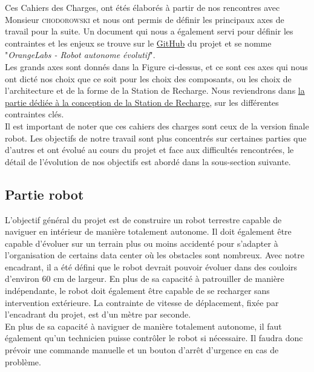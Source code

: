\documentclass[french]{rapportENSTAB}
\begin{document}
Ces Cahiers des Charges, ont étés élaborés à partir de nos rencontres avec Monsieur \textsc{chodorowski} et nous ont permis de définir les principaux axes de travail pour la suite. Un document qui nous a également servi pour définir les contraintes et les enjeux se trouve sur le  \href{https://github.com/AntoninLize/Projet_OrangeLabs}{GitHub} du projet et se nomme "\textit{OrangeLabs - Robot autonome évolutif}".\\

Les grands axes sont donnés dans la Figure ci-dessus, et ce sont ces axes qui nous ont dicté nos choix que ce soit pour les choix des composants, ou les choix de l'architecture et de la forme de la Station de Recharge. Nous reviendrons dans \hyperlink{partie_station2recharge}{la partie dédiée à la conception de la Station de Recharge}, sur les différentes contraintes clés.\\


Il est important de noter que ces cahiers des charges sont ceux de la version finale robot. Les objectifs de notre travail sont plus concentrés sur certaines parties que d'autres et ont évolué au cours du projet et face aux difficultés rencontrées, le  détail de l'évolution de nos objectifs est abordé dans la sous-section suivante. \\ 

\subsection{Partie robot}

L'objectif général du projet est de construire un robot terrestre capable de naviguer en intérieur de manière totalement autonome. Il doit également être capable d'évoluer sur un terrain plus ou moins accidenté pour s'adapter à l'organisation de certains data center où les obstacles sont nombreux. Avec notre encadrant, il a été défini que le robot devrait pouvoir évoluer dans des couloirs d'environ 60 cm de largeur. En plus de sa capacité à patrouiller de manière indépendante, le robot doit également être capable de se recharger sans intervention extérieure. La contrainte de vitesse de déplacement,  fixée par l'encadrant du projet, est d'un mètre par seconde. \\

En plus de sa capacité à naviguer de manière totalement autonome, il faut également qu'un technicien puisse contrôler le robot si nécessaire. Il faudra donc prévoir une commande manuelle et un bouton d'arrêt d'urgence en cas de problème. \\
\end{document}
